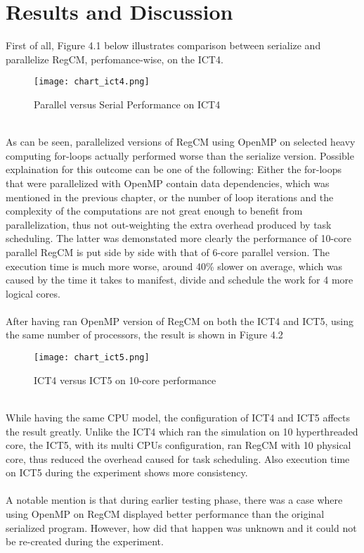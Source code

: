 \section{Results and Discussion}

First of all, Figure 4.1 below illustrates comparison between serialize and parallelize RegCM, perfomance-wise, on the ICT4. \\
\begin{figure}[H]
\texttt{[image: chart\_ict4.png]}
\centering
\caption{Parallel versus Serial Performance on ICT4}
\end{figure}
~\\
As can be seen, parallelized versions of RegCM using OpenMP on selected heavy computing for-loops actually performed worse than the serialize version. Possible explaination for this outcome can be one of the following: Either the for-loops that were parallelized with OpenMP contain data dependencies, which was mentioned in the previous chapter, or the number of loop iterations and the complexity of the computations are not great enough to benefit from parallelization, thus not out-weighting the extra overhead produced by task scheduling. The latter was demonstated more clearly the performance of 10-core parallel RegCM is put side by side with that of 6-core parallel version. The execution time is much more worse, around 40\% slower on average, which was caused by the time it takes to manifest, divide and schedule the work for 4 more logical cores. \\
~\\
After having ran OpenMP version of RegCM on both the ICT4 and ICT5, using the same number of processors, the result is shown in Figure 4.2
\begin{figure}[H]
\texttt{[image: chart\_ict5.png]}
\centering
\caption{ICT4 versus ICT5 on 10-core performance}
\end{figure}
~\\
While having the same CPU model, the configuration of ICT4 and ICT5 affects the result greatly. Unlike the ICT4 which ran the simulation on 10 hyperthreaded core, the ICT5, with its multi CPUs configuration, ran RegCM with 10 physical core, thus reduced the overhead caused for task scheduling. Also execution time on ICT5 during the experiment shows more consistency. \\
~\\
A notable mention is that during earlier testing phase, there was a case where using OpenMP on RegCM displayed better performance than the original serialized program. However, how did that happen was unknown and it could not be re-created during the experiment.
